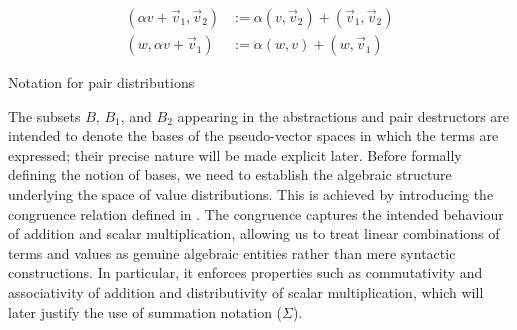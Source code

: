 \documentclass[runningheads,orivec,envcountsame,envcountsect]{llncs}
\def\Pair#1#2{(#1,#2)} %
\begin{document}
\begin{table*}[tb]
  \begin{align*}
    \Pair{\alpha  v+\vec{v}_1}{\vec{v}_2} & :=
    \alpha\Pair{v}{\vec{v}_2} + \Pair{\vec{v}_1}{\vec{v}_2}\\
    \Pair{w}{\alpha  v+\vec{v}_1} &:= \alpha\Pair{w}{v} + \Pair{w}{\vec{v}_1}
  \end{align*}
  \caption{Notation for pair distributions}
  \label{tab:PairsNotation}
\end{table*}

The subsets $B$, $B_1$, and $B_2$ appearing in the abstractions and pair
destructors are intended to denote the bases of the pseudo-vector spaces in
which the terms are expressed; their precise nature will be made explicit
later. Before formally defining the notion of bases, we need to establish the
algebraic structure underlying the space of value distributions. This is
achieved by introducing the congruence relation defined in
. The congruence captures the intended behaviour of
addition and scalar multiplication, allowing us to treat linear combinations of
terms and values as genuine algebraic entities rather than mere syntactic
constructions. In particular, it enforces properties such as commutativity and
associativity of addition and distributivity of scalar multiplication, which
will later justify the use of summation notation ($\Sigma$).
\end{document}
